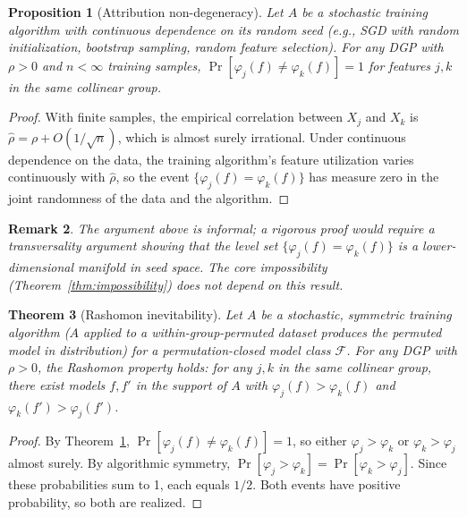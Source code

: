 \documentclass{article}
\newtheorem{theorem}{Theorem}
\newtheorem{proposition}[theorem]{Proposition}
\newtheorem{remark}[theorem]{Remark}
\begin{document}
\begin{proposition}[Attribution non-degeneracy]
\label{thm:non-degeneracy}
Let $A$ be a stochastic training algorithm with continuous dependence on its random seed (e.g., SGD with random initialization, bootstrap sampling, random feature selection). For any DGP with $\rho > 0$ and $n < \infty$ training samples, $\Pr[\varphi_j(f) \neq \varphi_k(f)] = 1$ for features $j, k$ in the same collinear group.
\end{proposition}

\begin{proof}
With finite samples, the empirical correlation between $X_j$ and $X_k$ is $\hat\rho = \rho + O(1/\sqrt{n})$, which is almost surely irrational. Under continuous dependence on the data, the training algorithm's feature utilization varies continuously with $\hat\rho$, so the event $\{\varphi_j(f) = \varphi_k(f)\}$ has measure zero in the joint randomness of the data and the algorithm.
\end{proof}

\begin{remark}
The argument above is informal; a rigorous proof would require a transversality argument showing that the level set $\{\varphi_j(f) = \varphi_k(f)\}$ is a lower-dimensional manifold in seed space. The core impossibility (Theorem~\ref{thm:impossibility}) does not depend on this result.
\end{remark}

\begin{theorem}[Rashomon inevitability]
\label{thm:rashomon-inevitability}
Let $A$ be a stochastic, symmetric training algorithm ($A$ applied to a within-group-permuted dataset produces the permuted model in distribution) for a permutation-closed model class $\mathcal{F}$. For any DGP with $\rho > 0$, the Rashomon property holds: for any $j, k$ in the same collinear group, there exist models $f, f'$ in the support of $A$ with $\varphi_j(f) > \varphi_k(f)$ and $\varphi_k(f') > \varphi_j(f')$.
\end{theorem}

\begin{proof}
By Theorem~\ref{thm:non-degeneracy}, $\Pr[\varphi_j(f) \neq \varphi_k(f)] = 1$, so either $\varphi_j > \varphi_k$ or $\varphi_k > \varphi_j$ almost surely. By algorithmic symmetry, $\Pr[\varphi_j > \varphi_k] = \Pr[\varphi_k > \varphi_j]$. Since these probabilities sum to 1, each equals $1/2$. Both events have positive probability, so both are realized.
\end{proof}
\end{document}
